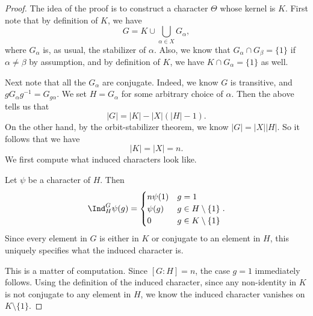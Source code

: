 \documentclass[a4paper]{article}
\begin{document}
\begin{proof}
  The idea of the proof is to construct a character $\Theta$ whose kernel is $K$. First note that by definition of $K$, we have
  \[
    G = K \cup \bigcup_{\alpha \in X} G_\alpha,
  \]
  where $G_\alpha$ is, as usual, the stabilizer of $\alpha$. Also, we know that $G_\alpha \cap G_\beta = \{1\}$ if $\alpha \not= \beta$ by assumption, and by definition of $K$, we have $K \cap G_\alpha = \{1\}$ as well.

  Next note that all the $G_\alpha$ are conjugate. Indeed, we know $G$ is transitive, and $g G_\alpha g^{-1} = G_{g\alpha}$. We set $H = G_\alpha$ for some arbitrary choice of $\alpha$. Then the above tells us that
  \[
    |G| = |K| - |X|(|H| - 1).
  \]
  On the other hand, by the orbit-stabilizer theorem, we know $|G| = |X| |H|$. So it follows that we have
  \[
    |K| = |X| = n.
  \]
  We first compute what induced characters look like.
  \begin{claim}
    Let $\psi$ be a character of $H$. Then
    \[
      \Ind_H^G \psi(g) =
      \begin{cases}
        n \psi (1) & g = 1\\
        \psi(g) & g \in H \setminus \{1\}\\
        0 & g \in K \setminus \{1\}
      \end{cases}.
    \]
    Since every element in $G$ is either in $K$ or conjugate to an element in $H$, this uniquely specifies what the induced character is.
  \end{claim}
  This is a matter of computation. Since $[G:H] = n$, the case $g = 1$ immediately follows. Using the definition of the induced character, since any non-identity in $K$ is not conjugate to any element in $H$, we know the induced character vanishes on $K \setminus \{1\}$.


\end{proof}
\end{document}
